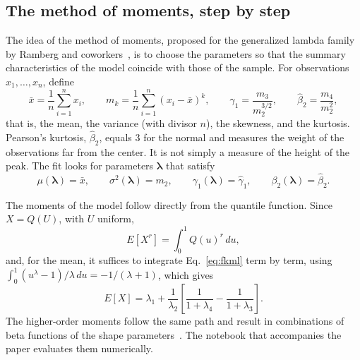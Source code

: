 \subsection{The method of moments, step by step}

The idea of the method of moments, proposed for the generalized lambda family by Ramberg and coworkers~\cite{ramberg1979}, is to choose the parameters so that the summary characteristics of the model coincide with those of the sample. For observations $x_1, \ldots, x_n$, define
\begin{equation}
    \bar x = \frac{1}{n}\sum_{i=1}^{n} x_i, \qquad
    m_k = \frac{1}{n}\sum_{i=1}^{n} (x_i - \bar x)^k, \qquad
    \widehat\gamma_1 = \frac{m_3}{m_2^{3/2}}, \qquad
    \widehat\beta_2 = \frac{m_4}{m_2^{2}},
    \label{eq:momentos_amostra}
\end{equation}
that is, the mean, the variance (with divisor $n$), the skewness, and the kurtosis. Pearson's kurtosis, $\widehat\beta_2$, equals $3$ for the normal and measures the weight of the observations far from the center. It is not simply a measure of the height of the peak. The fit looks for parameters $\boldsymbol\lambda$ that satisfy
\begin{equation}
    \mu(\boldsymbol\lambda) = \bar x, \qquad
    \sigma^2(\boldsymbol\lambda) = m_2, \qquad
    \gamma_1(\boldsymbol\lambda) = \widehat\gamma_1, \qquad
    \beta_2(\boldsymbol\lambda) = \widehat\beta_2.
    \label{eq:sistema}
\end{equation}

The moments of the model follow directly from the quantile function. Since $X = Q(U)$, with $U$ uniform,
\begin{equation}
    E[X^r] = \int_0^1 Q(u)^r \, du,
\end{equation}
and, for the mean, it suffices to integrate Eq.~\eqref{eq:fkml} term by term, using $\int_0^1 (u^{\lambda} - 1)/\lambda \, du = -1/(\lambda + 1)$, which gives
\begin{equation}
    E[X] = \lambda_1 + \frac{1}{\lambda_2}
    \left[\frac{1}{1 + \lambda_4} - \frac{1}{1 + \lambda_3}\right].
    \label{eq:media}
\end{equation}
The higher-order moments follow the same path and result in combinations of beta functions of the shape parameters~\cite{freimer1988,karian2011}. The notebook that accompanies the paper evaluates them numerically.

